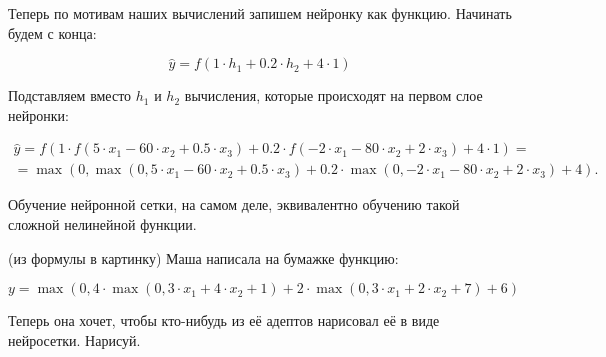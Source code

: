 \begin{sol}
Теперь по мотивам наших вычислений запишем нейронку как функцию. Начинать будем с конца:

$$
\hat y = f(1 \cdot h_1 + 0.2 \cdot h_2 + 4 \cdot 1)
$$

Подставляем вместо $h_1$ и $h_2$ вычисления, которые происходят на первом слое нейронки: 

\begin{multline*}
\hat y = f(1 \cdot f(5 \cdot x_1 -60 \cdot x_2 + 0.5 \cdot x_3) + 0.2 \cdot f(-2 \cdot x_1 -80 \cdot x_2 + 2 \cdot x_3) + 4 \cdot 1) = \\ = \max(0, \max(0, 5 \cdot x_1 -60 \cdot x_2 + 0.5 \cdot x_3) + 0.2 \cdot \max(0, -2 \cdot x_1 -80 \cdot x_2 + 2 \cdot x_3) + 4).
\end{multline*}

Обучение нейронной сетки, на самом деле, эквивалентно обучению такой сложной нелинейной функции. 
\end{sol}


\begin{problem}{(из формулы в картинку)}
Маша написала на бумажке функцию: 

\begin{equation*}
y = \max(0, 4 \cdot \max(0, 3 \cdot x_1 + 4 \cdot x_2 + 1) + 2 \cdot \max(0, 3 \cdot x_1 + 2 \cdot x_2 + 7) + 6)
\end{equation*} 

Теперь она хочет, чтобы кто-нибудь из её адептов нарисовал её в виде нейросетки. Нарисуй.
\end{problem}

